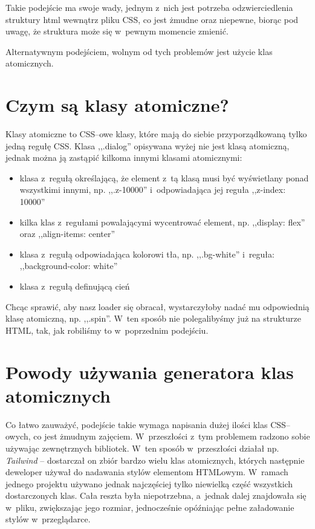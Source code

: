 \documentclass{SGGW-thesis}
\begin{document}
Takie podejście ma swoje wady, jednym z~nich jest potrzeba odzwierciedlenia struktury html wewnątrz pliku CSS, co jest żmudne oraz niepewne, biorąc pod uwagę, że struktura może się w~pewnym momencie zmienić.

Alternatywnym podejściem, wolnym od tych problemów jest użycie klas atomicznych\cite{css_master}.


\section{Czym są klasy atomiczne?}
Klasy atomiczne to CSS--owe klasy, które mają do siebie przyporządkowaną tylko jedną regułę CSS. Klasa ,,.dialog'' opisywana wyżej nie jest klasą atomiczną, jednak można ją zastąpić kilkoma innymi klasami atomicznymi:
\begin{itemize}
    \item klasa z~regułą określającą, że element z~tą klasą musi być wyświetlany ponad wszystkimi innymi, np. ,,.z-10000'' i~odpowiadająca jej reguła ,,z-index: 10000''
    \item kilka klas z~regułami powalającymi wycentrować element, np. ,,display: flex'' oraz ,,align-items: center''
    \item klasa z~regułą odpowiadająca kolorowi tła, np. ,,.bg-white'' i~reguła: ,,background-color: white''
    \item klasa z~regułą definującą cień
\end{itemize}

Chcąc sprawić, aby nasz loader się obracał, wystarczyłoby nadać mu odpowiednią klasę atomiczną, np. ,,.spin''. W~ten sposób nie polegalibyśmy już na strukturze HTML, tak, jak robiliśmy to w~poprzednim podejściu.


\section{Powody używania generatora klas atomicznych}
Co łatwo zauważyć, podejście takie wymaga napisania dużej ilości klas CSS--owych, co jest żmudnym zajęciem. W~przeszłości z~tym problemem radzono sobie używając zewnętrznych bibliotek. W~ten sposób w~przeszłości działał np. \emph{Tailwind} -- dostarczał on zbiór bardzo wielu klas atomicznych, których następnie deweloper używał do nadawania stylów elementom HTMLowym. W~ramach jednego projektu używano jednak najczęściej tylko niewielką część wszystkich dostarczonych klas. Cała reszta była niepotrzebna, a~jednak dalej znajdowała się w~pliku, zwiększając jego rozmiar, jednocześnie opóźniając pełne załadowanie stylów w~przeglądarce.
\end{document}
